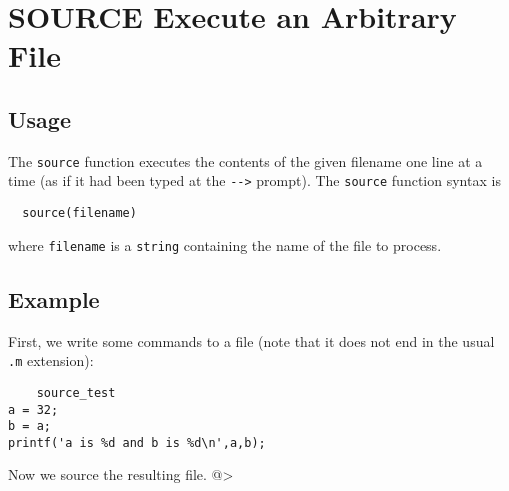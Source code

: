 \section{SOURCE Execute an Arbitrary File}

\subsection{Usage}

The \verb|source| function executes the contents of the given
filename one line at a time (as if it had been typed at
the \verb|-->| prompt).  The \verb|source| function syntax is
\begin{verbatim}
  source(filename)
\end{verbatim}
where \verb|filename| is a \verb|string| containing the name of
the file to process. 
\subsection{Example}

First, we write some commands to a file (note that it does
not end in the usual \verb|.m| extension):
\begin{verbatim}
    source_test
a = 32;
b = a;
printf('a is %d and b is %d\n',a,b);
\end{verbatim}
Now we source the resulting file.
@>
